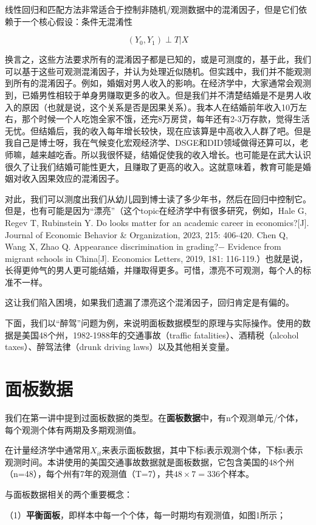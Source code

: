 \documentclass[cn,12pt,math=newtx,citestyle=gb7714-2015,bibstyle=gb7714-2015]{elegantbook}
\begin{document}
线性回归和匹配方法非常适合于控制非随机/观测数据中的混淆因子，但是它们依赖于一个核心假设：条件无混淆性

$$(Y_0, Y_1) \perp T | X$$

换言之，这些方法要求所有的混淆因子都是已知的，或是可测度的，基于此，我们可以基于这些可观测混淆因子，并认为处理近似随机。但实践中，我们并不能观测到所有的混淆因子。例如，婚姻对男人收入的影响。在经济学中，大家通常会观测到，已婚男性相较于单身男赚取更多的收入。但是我们并不清楚结婚是不是男人收入的原因（也就是说，这个关系是否是因果关系）。我本人在结婚前年收入10万左右，那个时候一个人吃饱全家不饿，还完8万房贷，每年还有2-3万存款，觉得生活无忧。但结婚后，我的收入每年增长较快，现在应该算是中高收入人群了吧。但是我自己是博士呀，我在气候变化宏观经济学、DSGE和DID领域做得还算可以，老师嘛，越来越吃香。所以我很怀疑，结婚促使我的收入增长。也可能是在武大认识很久了让我们结婚可能性更大，且赚取了更高的收入。这就意味着，教育可能是婚姻对收入因果效应的混淆因子。

对此，我们可以测度出我们从幼儿园到博士读了多少年书，然后在回归中控制它。但是，也有可能是因为“漂亮”（这个topic在经济学中有很多研究，例如，Hale G, Regev T, Rubinstein Y. Do looks matter for an academic career in economics?[J]. Journal of Economic Behavior \& Organization, 2023, 215: 406-420.  Chen Q, Wang X, Zhao Q. Appearance discrimination in grading?− Evidence from migrant schools in China[J]. Economics Letters, 2019, 181: 116-119.）也就是说，长得更帅气的男人更可能结婚，并赚取得更多。可惜，漂亮不可观测，每个人的标准不一样。

这让我们陷入困境，如果我们遗漏了漂亮这个混淆因子，回归肯定是有偏的。

下面，我们以“醉驾”问题为例，来说明面板数据模型的原理与实际操作。使用的数据是美国48个州，1982-1988年的交通事故（traffic fatalities）、酒精税（alcohol taxes）、醉驾法律（drunk driving laws）以及其他相关变量。


\section{面板数据}
我们在第一讲中提到过面板数据的类型。在\textbf{面板数据}中，有n个观测单元/个体，每个观测个体有两期及多期观测值。

在计量经济学中通常用$X_{it}$来表示面板数据，其中下标i表示观测个体，下标t表示观测时间。本讲使用的美国交通事故数据就是面板数据，它包含美国的48个州（n=48），每个州有7年的观测值（T=7），共$48\times7=336$个样本。

与面板数据相关的两个重要概念：

（1）\textbf{平衡面板}，即样本中每一个个体，每一时期均有观测值，如图1所示；
\end{document}
